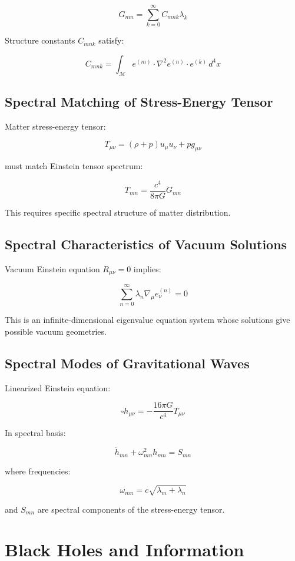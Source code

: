 \documentclass[12pt,a4paper]{article}
\begin{document}
$$G_{mn} = \sum_{k=0}^{\infty} C_{mnk} \lambda_k$$

Structure constants $C_{mnk}$ satisfy:

$$C_{mnk} = \int_{\mathcal{M}} e^{(m)} \cdot \nabla^2 e^{(n)} \cdot e^{(k)} \, d^4x$$

\subsection{Spectral Matching of Stress-Energy Tensor}

Matter stress-energy tensor:

$$T_{\mu\nu} = (\rho + p) u_\mu u_\nu + p g_{\mu\nu}$$

must match Einstein tensor spectrum:

$$T_{mn} = \frac{c^4}{8\pi G} G_{mn}$$

This requires specific spectral structure of matter distribution.

\subsection{Spectral Characteristics of Vacuum Solutions}

Vacuum Einstein equation $R_{\mu\nu} = 0$ implies:

$$\sum_{n=0}^{\infty} \lambda_n \nabla_\mu e_\nu^{(n)} = 0$$

This is an infinite-dimensional eigenvalue equation system whose solutions give possible vacuum geometries.

\subsection{Spectral Modes of Gravitational Waves}

Linearized Einstein equation:

$$\square h_{\mu\nu} = -\frac{16\pi G}{c^4} T_{\mu\nu}$$

In spectral basis:

$$\ddot{h}_{mn} + \omega_{mn}^2 h_{mn} = S_{mn}$$

where frequencies:

$$\omega_{mn} = c \sqrt{\lambda_m + \lambda_n}$$

and $S_{mn}$ are spectral components of the stress-energy tensor.

\section{Black Holes and Information}
\end{document}
